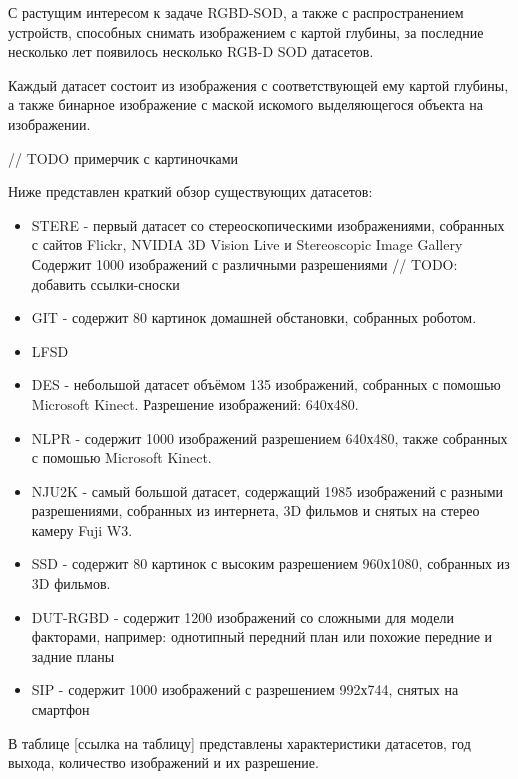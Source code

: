 С растущим интересом к задаче RGBD-SOD, а также с распространением устройств, способных 
снимать изображением с картой глубины, за последние несколько лет появилось несколько RGB-D SOD датасетов.

Каждый датасет состоит из изображения с соответствующей ему картой глубины, а также
бинарное изображение с маской искомого выделяющегося объекта на изображении.

// TODO примерчик с картиночками

Ниже представлен краткий обзор существующих датасетов:
\begin{itemize}
    \item STERE \cite{STERE} - первый датасет со стереоскопическими изображениями, собранных с сайтов Flickr, NVIDIA 3D Vision Live и Stereoscopic Image Gallery
    Содержит 1000 изображений с различными разрешениями // TODO: добавить ссылки-сноски
    \item GIT \cite{GIT} - содержит 80 картинок домашней обстановки, собранных роботом.
    \item LFSD \cite{LFSD}
    \item DES \cite{DES} - небольшой датасет объёмом 135 изображений, собранных с помошью Microsoft Kinect. Разрешение изображений: 640х480.
    \item NLPR \cite{NLPR} - содержит 1000 изображений разрешением 640х480, также собранных с помошью Microsoft Kinect.
    \item NJU2K \cite{NJU2K} - самый большой датасет, содержащий 1985 изображений с разными разрешениями, собранных из интернета, 3D фильмов и снятых на стерео камеру Fuji W3.
    \item SSD \cite{SSD} - содержит 80 картинок с высоким разрешением 960х1080, собранных из 3D фильмов.
    \item DUT-RGBD \cite{DUT} - содержит 1200 изображений со сложными для модели факторами, например: однотипный передний план или похожие передние и задние планы
    \item SIP \cite{Rethinking-RGBD} - содержит 1000 изображений с разрешением 992х744, снятых на смартфон
\end{itemize}

В таблице [ссылка на таблицу] представлены характеристики датасетов, год выхода, количество изображений и их разрешение.

